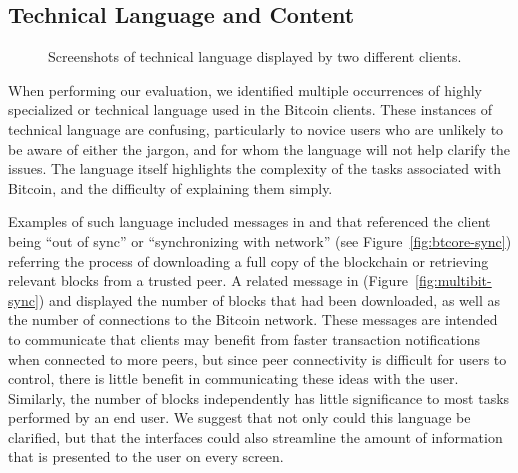 \subsection{Technical Language and Content}
\begin{figure}[htb]
        \centering
                
        
        \caption{Screenshots of technical language displayed by two different clients. }\label{fig:techlang}
\end{figure}
%
When performing our evaluation, we identified multiple occurrences of highly specialized or technical language used in the Bitcoin clients. These instances of technical language are confusing, particularly to novice users who are unlikely to be aware of either the jargon, and for whom the language will not help clarify the issues. The language itself highlights the complexity of the tasks associated with Bitcoin, and the difficulty of explaining them simply.

Examples of such language included messages in \multibit and  \Bitcoinclient that referenced the client being ``out of sync'' or ``synchronizing with network'' (see Figure~\ref{fig:btcore-sync}) referring the process of downloading a full copy of the blockchain or retrieving relevant blocks from a trusted peer. A related message in \multibit (Figure~\ref{fig:multibit-sync}) and \armory displayed the number of blocks that had been downloaded, as well as the number of connections to the Bitcoin network. These messages are intended to communicate that clients may benefit from faster transaction notifications when connected to more peers, but since peer connectivity is difficult for users to control, there is little benefit in communicating these ideas with the user. Similarly, the number of blocks independently has little significance to most tasks performed by an end user. We suggest that not only could this language be clarified, but that the interfaces could also streamline the amount of information that is presented to the user on every screen.

